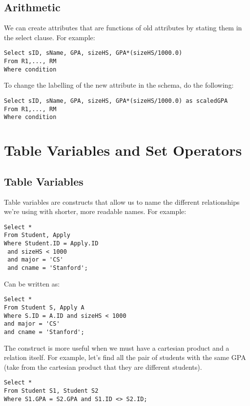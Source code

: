 \documentclass[11pt, oneside]{article}   	%
\begin{document}
\subsection{Arithmetic}

We can create attributes that are functions of old attributes by stating them in the select clause. For example:

\begin{lstlisting}
Select sID, sName, GPA, sizeHS, GPA*(sizeHS/1000.0)
From R1,..., RM
Where condition
\end{lstlisting}

To change the labelling of the new attribute in the schema, do the following:

\begin{lstlisting}
Select sID, sName, GPA, sizeHS, GPA*(sizeHS/1000.0) as scaledGPA
From R1,..., RM
Where condition
\end{lstlisting}

\section{Table Variables and Set Operators}

\subsection{Table Variables}

Table variables are constructs that allow us to name the different relationships we're using with shorter, more readable names. For example:

\begin{lstlisting}
Select *
From Student, Apply
Where Student.ID = Apply.ID
 and sizeHS < 1000 
 and major = 'CS' 
 and cname = 'Stanford';
\end{lstlisting}

Can be written as:

\begin{lstlisting}
Select *
From Student S, Apply A
Where S.ID = A.ID and sizeHS < 1000 
and major = 'CS' 
and cname = 'Stanford';
\end{lstlisting}

The construct is more useful when we must have a cartesian product and a relation itself. For example, let's find all the pair of students with the same GPA (take from the cartesian product that they are different students). 

\begin{lstlisting}
Select *
From Student S1, Student S2
Where S1.GPA = S2.GPA and S1.ID <> S2.ID;
\end{lstlisting}
\end{document}
